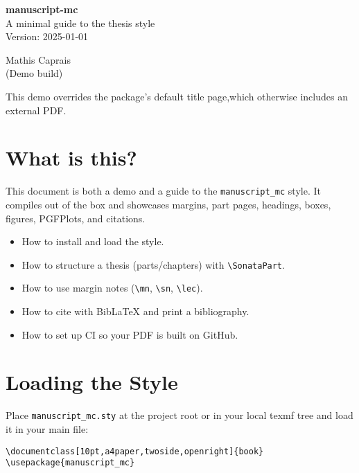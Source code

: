 \documentclass[10pt,a4paper,twoside,openright]{book}
\renewcommand{\maketitle}{%
  \thispagestyle{empty}%
  \begin{center}
    {\LARGE\bfseries manuscript-mc\\[0.5em]}
    {\large A minimal guide to the thesis style}\\[1.5em]
    {\normalsize Version: 2025-01-01}\par\vfill
    {\large Mathis Caprais}\\[0.25em]
    {\normalsize (Demo build)}\par\vfill
    {\footnotesize This demo overrides the package's default title page,\newline which otherwise includes an external PDF.}
  \end{center}
  \clearpage
}
\begin{document}
\maketitle
\insertcustomtoc
\pagestyle{fancynotes}

\chapter*{What is this?}
This document is both a demo and a guide to the \texttt{manuscript\_mc} style. It compiles out of the box and showcases margins, part pages, headings, boxes, figures, PGFPlots, and citations.

\begin{summary}
\begin{itemize}
  \item How to install and load the style.
  \item How to structure a thesis (parts/chapters) with \verb|\SonataPart|.
  \item How to use margin notes (\verb|\mn|, \verb|\sn|, \verb|\lec|).
  \item How to cite with BibLaTeX and print a bibliography.
  \item How to set up CI so your PDF is built on GitHub.
\end{itemize}
\end{summary}

\chapter{Loading the Style}
Place \texttt{manuscript\_mc.sty} at the project root or in your local texmf tree and load it in your main file:

\begin{examplebox}
\begin{verbatim}
\documentclass[10pt,a4paper,twoside,openright]{book}
\usepackage{manuscript_mc}
\end{verbatim}
\end{examplebox}
\end{document}
